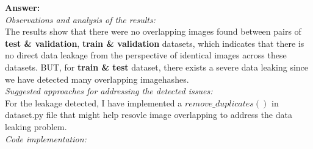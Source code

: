 \documentclass[11pt, oneside]{article}   	%
\begin{document}
\textbf{Answer:} 
\\
\textit{Observations and analysis of the results: }
\\
The results show that there were no overlapping images found between pairs of \textbf{test \& validation}, \textbf{train \& validation} datasets, which indicates that there is no direct data leakage from the perspective of identical images across these datasets.
BUT, for \textbf{train \& test} dataset, there exists a severe data leaking since we have detected many overlapping imagehashes.
\\
\textit{Suggested approaches for addressing the detected issues: }
\\
For the leakage detected, I have implemented a $remove\_duplicates()$ in dataset.py file that might help resovle image overlapping to address the data leaking problem.
\\
\textit{Code implementation: }
\end{document}
